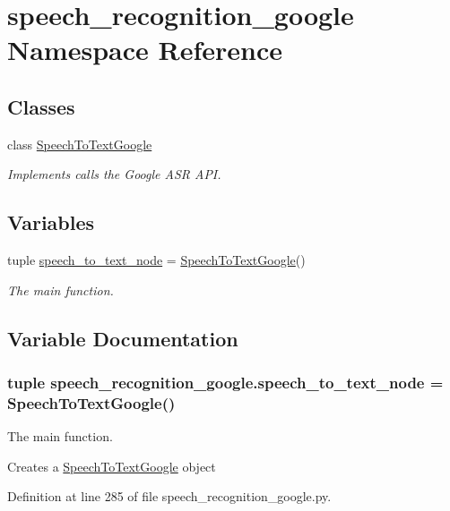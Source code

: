 \hypertarget{namespacespeech__recognition__google}{\section{speech\-\_\-recognition\-\_\-google Namespace Reference}
\label{namespacespeech__recognition__google}
}
\subsection*{Classes}
\begin{DoxyCompactItemize}
\item 
class \hyperlink{classspeech__recognition__google_1_1SpeechToTextGoogle}{Speech\-To\-Text\-Google}
\begin{DoxyCompactList}\small\item\em Implements calls the Google A\-S\-R A\-P\-I. \end{DoxyCompactList}\end{DoxyCompactItemize}
\subsection*{Variables}
\begin{DoxyCompactItemize}
\item 
tuple \hyperlink{namespacespeech__recognition__google_a72262ab039ae77c265a0575478792276}{speech\-\_\-to\-\_\-text\-\_\-node} = \hyperlink{classspeech__recognition__google_1_1SpeechToTextGoogle}{Speech\-To\-Text\-Google}()
\begin{DoxyCompactList}\small\item\em The main function. \end{DoxyCompactList}\end{DoxyCompactItemize}


\subsection{Variable Documentation}
\hypertarget{namespacespeech__recognition__google_a72262ab039ae77c265a0575478792276}{
\subsubsection[{speech\-\_\-to\-\_\-text\-\_\-node}]{\setlength{\rightskip}{0pt plus 5cm}tuple speech\-\_\-recognition\-\_\-google.\-speech\-\_\-to\-\_\-text\-\_\-node = {\bf Speech\-To\-Text\-Google}()}}\label{namespacespeech__recognition__google_a72262ab039ae77c265a0575478792276}


The main function. 

Creates a \hyperlink{classspeech__recognition__google_1_1SpeechToTextGoogle}{Speech\-To\-Text\-Google} object 

Definition at line 285 of file speech\-\_\-recognition\-\_\-google.\-py.

